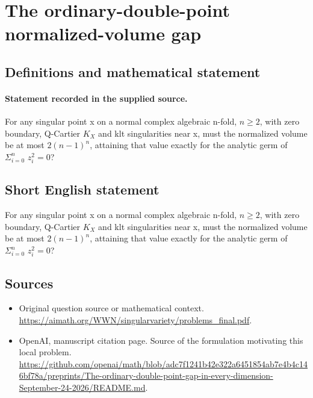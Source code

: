 \documentclass[11pt]{article}
\begin{document}
\section*{The ordinary-double-point normalized-volume gap}\label{30007051}
\subsection{Definitions and mathematical statement}
\paragraph{Statement recorded in the supplied source.}
For any singular point x on a normal complex algebraic n-fold, $n\geq 2$, with zero boundary, Q-Cartier $K_X$ and klt singularities near x, must the normalized volume be at most $2(n-1)^n$, attaining that value exactly for the analytic germ of $\Sigma _{i=0}^n$ $z_i^{2}=0$?
\subsection{Short English statement}
For any singular point x on a normal complex algebraic n-fold, $n\geq 2$, with zero boundary, Q-Cartier $K_X$ and klt singularities near x, must the normalized volume be at most $2(n-1)^n$, attaining that value exactly for the analytic germ of $\Sigma _{i=0}^n$ $z_i^{2}=0$?
\subsection{Sources}
\begin{itemize}
\item[S1] Original question source or mathematical context.
\url{https://aimath.org/WWN/singularvariety/problems_final.pdf}.
\item[S2] OpenAI, manuscript citation page. Source of the formulation motivating this local problem.
\url{https://github.com/openai/math/blob/adc7f1241b42e322a6451854ab7e4b4c146bf78a/preprints/The-ordinary-double-point-gap-in-every-dimension-September-24-2026/README.md}.
\end{itemize}
\end{document}
